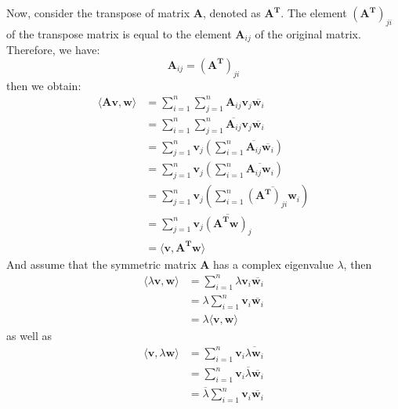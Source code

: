 \documentclass[oneside]{book}
\begin{document}
{{        Now, consider the transpose of matrix $\mathbf{A}$, denoted as $\mathbf{A}^{\mathbf{T}}$. The element $\left(\mathbf{A}^{\mathbf{T}}\right)_{ji}$ of the transpose matrix is equal to the element $\mathbf{A}_{ij}$ of the original matrix. Therefore, we have:
        \[\mathbf{A}_{ij}=\left(\mathbf{A}^{\mathbf{T}}\right)_{ji}\]
        then we obtain:
        \begin{align}
            \langle\mathbf{A}\mathbf{v},\mathbf{w}\rangle
                &=\sum_{i=1}^{n}\sum_{j=1}^{n}\mathbf{A}_{ij}\mathbf{v}_{j}\overline{\mathbf{w}_{i}}\\
                &=\sum_{i=1}^{n}\sum_{j=1}^{n}\overline{\mathbf{A}_{ij}}\mathbf{v}_{j}\overline{\mathbf{w}_{i}}\\
                &=\sum_{j=1}^{n}\mathbf{v}_{j}\left(\sum_{i=1}^{n}\overline{\mathbf{A}_{ij}}\overline{\mathbf{w}_{i}}\right)\\
                &=\sum_{j=1}^{n}\mathbf{v}_{j}\left(\sum_{i=1}^{n}\overline{\mathbf{A}_{ij}\mathbf{w}_{i}}\right)\\
                &=\sum_{j=1}^{n}\mathbf{v}_{j}\left(\sum_{i=1}^{n}\overline{(\mathbf{A}^{\mathbf{T}})_{ji}\mathbf{w}_{i}}\right)\\
                &=\sum_{j=1}^{n}\mathbf{v}_{j}\overline{\left(\mathbf{A}^{\mathbf{T}}\mathbf{w}\right)_{j}}\\
                &=\langle\mathbf{v},\mathbf{A}^{\mathbf{T}}\mathbf{w}\rangle
        \end{align}
        And assume that the symmetric matrix $\mathbf{A}$ has a complex eigenvalue $\lambda$, then
        \begin{align}
            \langle\lambda\mathbf{v},\mathbf{w}\rangle
                &=\sum_{i=1}^{n}\lambda\mathbf{v}_{i}\overline{\mathbf{w}_{i}}\\
                &=\lambda\sum_{i=1}^{n}\mathbf{v}_{i}\overline{\mathbf{w}_{i}}\\
                &=\lambda\langle\mathbf{v},\mathbf{w}\rangle
        \end{align}
        as well as
        \begin{align}
            \langle\mathbf{v},\lambda\mathbf{w}\rangle
                &=\sum_{i=1}^{n}\mathbf{v}_{i}\overline{\lambda\mathbf{w}_{i}}\\
                &=\sum_{i=1}^{n}\mathbf{v}_{i}\overline{\lambda}\overline{\mathbf{w}_{i}}\\
                &=\overline{\lambda}\sum_{i=1}^{n}\mathbf{v}_{i}\overline{\mathbf{w}_{i}}\\

\end{align}}}
\end{document}
